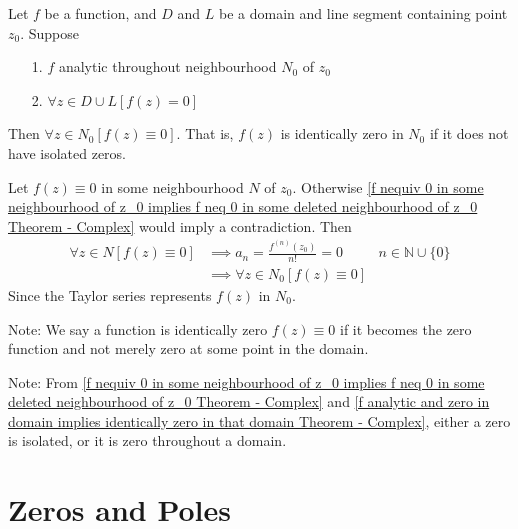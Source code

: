 \documentclass[12pt, english]{book}
\makeatletter
\renewenvironment{proof}[1][\proofname]{\par
	\pushQED{\qed}%
	\normalfont \topsep6\p@\@plus6\p@\relax
	\list{}{%
		\settowidth{\leftmargin}{\itshape\proofname:\hskip\labelsep}%
		\setlength{\labelwidth}{0pt}%
		\setlength{\itemindent}{-\leftmargin}%
		}%
	\item[\hskip\labelsep\itshape#1\@addpunct{:}]\ignorespaces
	}{\popQED\endlist\@endpefalse}
\makeatother
\begin{document}
	\begin{theorem}
		\label{f analytic and zero in domain implies identically zero in that domain Theorem - Complex}
		Let \(f\) be a function, and \(D\) and \(L\) be a domain and line segment containing point \(z_0\). Suppose
		\begin{itemize}
			\item[1.] \(f\) analytic throughout neighbourhood \(N_0\) of \(z_0\)
			\item[2.] \(\forall z \in D\cup L [f(z) = 0]\)
		\end{itemize}
		Then \(\forall z \in N_0 [f(z) \equiv 0]\). That is, \(f(z)\) is identically zero in \(N_0\) if it does not have isolated zeros.
	\end{theorem}
	\begin{proof}
		Let \(f(z) \equiv 0\) in some neighbourhood \(N\) of \(z_0\). Otherwise \cref{f nequiv 0 in some neighbourhood of z_0 implies f neq 0 in some deleted neighbourhood of z_0 Theorem - Complex} would imply a contradiction. Then 
		\begin{align*}
			\forall z \in N [f(z) \equiv 0]
			&\implies a_n  = \frac{f^{(n)}(z_0)}{n!} = 0	&	n \in \mathbb{N} \cup \{0\} \\
			&\implies \forall z \in N_0 [f(z) \equiv 0]
		\end{align*}
		Since the Taylor series represents \(f(z)\) in \(N_0\).
	\end{proof}

	Note: We say a function is identically zero \(f(z) \equiv 0\) if it becomes the zero function and not merely zero at some point in the domain.
	
	Note: From \cref{f nequiv 0 in some neighbourhood of z_0 implies f neq 0 in some deleted neighbourhood of z_0 Theorem - Complex} and \cref{f analytic and zero in domain implies identically zero in that domain Theorem - Complex}, either a zero is isolated, or it is zero throughout a domain.
	
	\section{Zeros and Poles} \label{Zeros and Poles Section - Complex}
	
\end{document}
